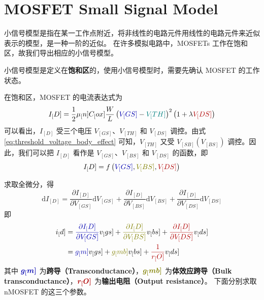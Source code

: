 \section{MOSFET Small Signal Model}

小信号模型是指在某一工作点附近，将非线性的电路元件用线性的电路元件来近似表示的模型，是一种一阶的近似。
在许多模拟电路中，MOSFETs 工作在饱和区，故我们导出相应的小信号模型。
\begin{hint}
    小信号模型是定义在\textbf{饱和区}的，使用小信号模型时，需要先确认 MOSFET 的工作状态。
\end{hint}

在饱和区，MOSFET 的电流表达式为
\begin{equation}
    I_[D] = \frac{1}{2} \mu_[n] C_[ox] \frac{W}{L} \left( \textcolor{deep-blue}{V_[GS]} - \textcolor{Teal}{V_[TH]} \right)^2 \left( 1 + \lambda \textcolor{deep-red}{V_[DS]} \right)
\end{equation}
可以看出，$I_[D]$ 受三个电压 $V_[GS]$、$V_[TH]$ 和 $V_[DS]$ 调控。由式 \ref{eq:threshold_voltage_body_effect} 可知，$V_[TH]$ 又受 $V_[SB](V_[BS])$ 调控。因此，我们可以把 $I_[D]$ 看作是 $V_[GS]$、$V_[BS]$ 和 $V_[DS]$ 的函数，即
\begin{equation}
    I_[D] = f \left( \textcolor{deep-blue}{V_[GS]}, \textcolor{Olive}{V_[BS]}, \textcolor{deep-red}{V_[DS]} \right)
\end{equation}

求取全微分，得
\begin{equation}
    \mathrm{d} I_[D] = \frac{\partial I_[D]}{\partial V_[GS]} \mathrm{d} V_[GS] + \frac{\partial I_[D]}{\partial V_[BS]} \mathrm{d} V_[BS] + \frac{\partial I_[D]}{\partial V_[DS]} \mathrm{d} V_[DS]
\end{equation}
即
\begin{equation}
    \begin{aligned}
        i_[d] &= \textcolor{deep-blue}{\frac{\partial I_[D]}{\partial V_[GS]}} v_[gs] + \textcolor{Olive}{\frac{\partial I_[D]}{\partial V_[BS]}} v_[bs] + \textcolor{deep-red}{\frac{\partial I_[D]}{\partial V_[DS]}} v_[ds] \\
        &= \textcolor{deep-blue}{g_[m]} v_[gs] + \textcolor{Olive}{g_[mb]} v_[bs] + \textcolor{deep-red}{\frac{1}{r_[O]}} v_[ds]
    \end{aligned}
\end{equation}
其中 $\bm{\textcolor{deep-blue}{g_[m]}}$ 为\textbf{跨导（Transconductance）}，$\bm{\textcolor{Olive}{g_[mb]}}$ 为\textbf{体效应跨导（Bulk transconductance）}，$\bm{\textcolor{deep-red}{r_[O]}}$ 为\textbf{输出电阻（Output resistance）}。
下面分别求取 nMOSFET 的这三个参数。

